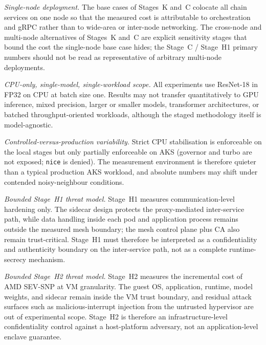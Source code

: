 \emph{Single-node deployment.} The base cases of Stages~K and~C colocate all chain
services on one node so that the measured cost is attributable to orchestration and gRPC
rather than to wide-area or inter-node networking. The cross-node and multi-node
alternatives of Stages~K and~C are explicit
sensitivity stages that bound the cost the single-node base case hides; the
Stage~C / Stage~H1 primary numbers should not be read as representative of arbitrary multi-node
deployments.

\emph{CPU-only, single-model, single-workload scope.} All experiments use ResNet-18 in
FP32 on CPU at batch size one. Results may not transfer quantitatively to GPU
inference, mixed precision, larger or smaller models, transformer architectures, or
batched throughput-oriented workloads, although the staged methodology itself is
model-agnostic.

\emph{Controlled-versus-production variability.} Strict CPU stabilisation is enforceable
on the local stages but only partially enforceable on AKS (governor and turbo are not
exposed; \texttt{nice} is denied). The measurement environment is therefore quieter than
a typical production AKS workload, and absolute numbers may shift under contended
noisy-neighbour conditions.

\emph{Bounded Stage~H1 threat model.} Stage~H1 measures communication-level hardening only.
The sidecar design protects the proxy-mediated inter-service path, while data handling
inside each pod and application process remains outside the measured mesh boundary; the
mesh control plane plus CA also remain trust-critical. Stage~H1 must therefore be
interpreted as a confidentiality and authenticity boundary on the inter-service path,
not as a complete runtime-secrecy mechanism.

\emph{Bounded Stage~H2 threat model.} Stage~H2 measures the incremental cost of AMD SEV-SNP at
VM granularity. The guest OS, application, runtime, model weights, and sidecar remain
inside the VM trust boundary, and residual attack surfaces such as malicious-interrupt
injection from the untrusted hypervisor are out of experimental scope. Stage~H2 is therefore
an infrastructure-level confidentiality control against a host-platform adversary, not an
application-level enclave guarantee.


